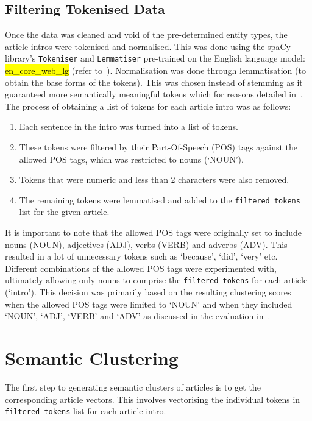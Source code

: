 \subsection{Filtering Tokenised Data} \label{filtered_tokens}
Once the data was cleaned and void of the pre-determined entity types, the article intros were tokenised and normalised. This was done using the spaCy library's \texttt{Tokeniser} and \texttt{Lemmatiser} pre-trained on the English language model: \hl{en\_core\_web\_lg} (refer to~). Normalisation was done through lemmatisation (to obtain the base forms of the tokens). This was chosen instead of stemming as it guaranteed more semantically meaningful tokens which for reasons detailed in~. The process of obtaining a list of tokens for each article intro was as follows:
\begin{enumerate}
    \item Each sentence in the intro was turned into a list of tokens.
    \item These tokens were filtered by their Part-Of-Speech (POS) tags against the allowed POS tags, which was restricted to nouns (`NOUN').
    \item Tokens that were numeric and less than 2 characters were also removed. 
    \item The remaining tokens were lemmatised and added to the \texttt{filtered\_tokens} list for the given article.
\end{enumerate}

It is important to note that the allowed POS tags were originally set to include nouns (NOUN), adjectives (ADJ), verbs (VERB) and adverbs (ADV). This resulted in a lot of unnecessary tokens such as `because', ‘did’, ‘very’ etc. Different combinations of the allowed POS tags were experimented with, ultimately allowing only nouns to comprise the \texttt{filtered\_tokens} for each article (`intro'). This decision was primarily based on the resulting clustering scores when the allowed POS tags were limited to `NOUN' and when they included `NOUN', `ADJ', `VERB' and `ADV' as discussed in the evaluation in~.

\section{Semantic Clustering} \label{s:semantic_clustering}

The first step to generating semantic clusters of articles is to get the corresponding article vectors. This involves vectorising the individual tokens in \texttt{filtered\_tokens} list for each article intro.

